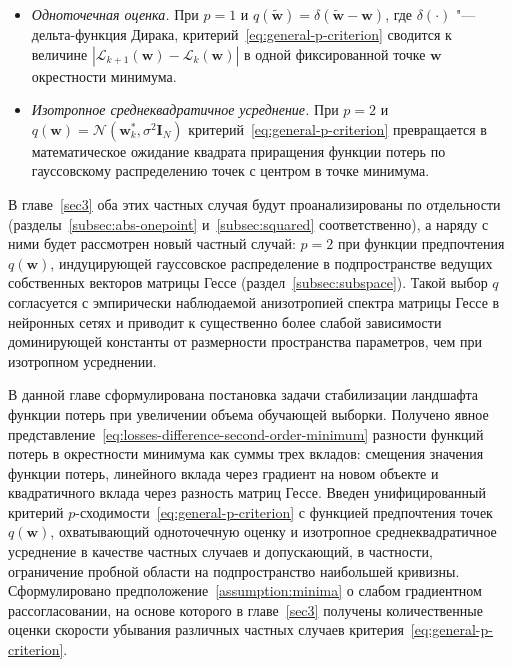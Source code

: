 \begin{itemize}
    \item \emph{Одноточечная оценка.} При $p=1$ и $q(\tilde{\mathbf w})=\delta(\tilde{\mathbf w}-\mathbf w)$, где $\delta(\cdot)$ "--- дельта-функция Дирака, критерий~\eqref{eq:general-p-criterion} сводится к величине $|\mathcal L_{k+1}(\mathbf w)-\mathcal L_k(\mathbf w)|$ в одной фиксированной точке $\mathbf w$ окрестности минимума.
    \item \emph{Изотропное среднеквадратичное усреднение.} При $p=2$ и $q(\mathbf w)=\mathcal N(\mathbf w_k^*, \sigma^2 \mathbf I_N)$ критерий~\eqref{eq:general-p-criterion} превращается в математическое ожидание квадрата приращения функции потерь по гауссовскому распределению точек с центром в точке минимума.
\end{itemize}

В главе~\ref{sec3} оба этих частных случая будут проанализированы по отдельности (разделы~\ref{subsec:abs-onepoint} и~\ref{subsec:squared} соответственно), а наряду с ними будет рассмотрен новый частный случай: $p=2$ при функции предпочтения $q(\mathbf w)$, индуцирующей гауссовское распределение в подпространстве ведущих собственных векторов матрицы Гессе (раздел~\ref{subsec:subspace}). Такой выбор $q$ согласуется с эмпирически наблюдаемой анизотропией спектра матрицы Гессе в нейронных сетях и приводит к существенно более слабой зависимости доминирующей константы от размерности пространства параметров, чем при изотропном усреднении.

В данной главе сформулирована постановка задачи стабилизации ландшафта функции потерь при увеличении объема обучающей выборки. Получено явное представление~\eqref{eq:losses-difference-second-order-minimum} разности функций потерь в окрестности минимума как суммы трех вкладов: смещения значения функции потерь, линейного вклада через градиент на новом объекте и квадратичного вклада через разность матриц Гессе. Введен унифицированный критерий $p$-сходимости~\eqref{eq:general-p-criterion} с функцией предпочтения точек $q(\mathbf w)$, охватывающий одноточечную оценку и изотропное среднеквадратичное усреднение в качестве частных случаев и допускающий, в частности, ограничение пробной области на подпространство наибольшей кривизны. Сформулировано предположение~\ref{assumption:minima} о слабом градиентном рассогласовании, на основе которого в главе~\ref{sec3} получены количественные оценки скорости убывания различных частных случаев критерия~\eqref{eq:general-p-criterion}.
